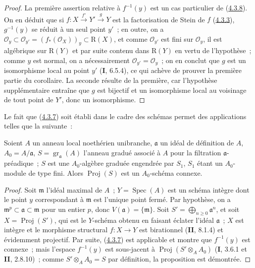 \begin{proof}
La première assertion relative à $f^{-1}(y)$ est un cas particulier de
(\hyperref[III.4.3.8-fr]{4.3.8}). On en
déduit que si $f:X\xrightarrow{f'}Y'\xrightarrow{g}Y$ est la factorisation
de Stein de $f$ (\hyperref[III.4.3.3-fr]{4.3.3}), $g^{-1}(y)$ se réduit à
un seul point $y'$~; en outre, on a
$\mathcal O_y\subset\mathcal O_{y'}=(f_*(\mathcal O_X))_y
\subset\mathrm R(X)$,
et comme $\mathcal O_{y'}$ est fini sur $\mathcal O_y$, il est algébrique sur
$\mathrm R(Y)$ et par suite contenu dans $\mathrm R(Y)$ en vertu
de l'hypothèse~; comme $y$ est normal, on a nécessairement
$\mathcal O_{y'}=\mathcal O_y$~; on en conclut que $g$ est un isomorphisme
local au point $y'$ (\textbf{I}, 6.5.4), ce qui achève de prouver la première partie
du corollaire. La seconde résulte de la première, car l'hypothèse
supplémentaire entraîne que $g$ est bijectif et un isomorphisme local au
voisinage de tout point de $Y'$, donc un isomorphisme.
\end{proof}

Le fait que (\hyperref[III.4.3.7-fr]{4.3.7}) soit établi dans le cadre des
schémas permet des applications telles que la suivante~:

\begin{proposition}[4.3.13]
\label{III.4.3.13-fr}
Soient $A$ un anneau local noethérien unibranche, $\mathfrak a$ un idéal de
définition de $A$, $A_0=A/\mathfrak a$,
$S=\operatorname{gr}_{\mathfrak a}(A)$ l'anneau gradué associé à $A$ pour
la filtration $\mathfrak a$-préadique~; $S$ est une $A_0$-algèbre graduée
engendrée par $S_1$, $S_1$ étant un $A_0$-module de type fini. Alors
$\operatorname{Proj}(S)$ est un $A_0$-schéma connexe.
\end{proposition}

\begin{proof}
Soit $\mathfrak m$ l'idéal maximal de $A$~; $Y=\operatorname{Spec}(A)$ est
un schéma intègre dont le point $y$ correspondant à $\mathfrak m$ est
l'unique point fermé. Par hypothèse, on a
$\mathfrak m^p\subset\mathfrak a\subset\mathfrak m$ pour un entier $p$,
donc $V(\mathfrak a)=\{\mathfrak m\}$. Soit
$S'=\bigoplus_{n\geq0}\mathfrak a^n$, et soit
$X=\operatorname{Proj}(S')$, qui est le $Y$-schéma obtenu en faisant éclater
l'idéal $\mathfrak a$~; $X$ est intègre et le morphisme structural
$f:X\to Y$ est birationnel (\textbf{II}, 8.1.4) et évidemment projectif. Par suite,
(\hyperref[III.4.3.7-fr]{4.3.7}) est applicable et montre que $f^{-1}(y)$
est connexe~; mais l'espace $f^{-1}(y)$ est sous-jacent à
$\operatorname{Proj}(S'\otimes_AA_0)$ (\textbf{I}, 3.6.1 et \textbf{II}, 2.8.10)~; comme
$S'\otimes_AA_0=S$ par définition, la proposition est démontrée.
\end{proof}


